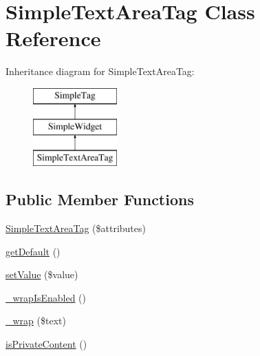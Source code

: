 \hypertarget{class_simple_text_area_tag}{
\section{SimpleTextAreaTag Class Reference}
\label{class_simple_text_area_tag}
}
Inheritance diagram for SimpleTextAreaTag:\begin{figure}[H]
\begin{center}
\leavevmode
\includegraphics[height=3.000000cm]{class_simple_text_area_tag}
\end{center}
\end{figure}
\subsection*{Public Member Functions}
\begin{DoxyCompactItemize}
\item 
\hyperlink{class_simple_text_area_tag_a022780742c3c3265a938c0809a45661c}{SimpleTextAreaTag} (\$attributes)
\item 
\hyperlink{class_simple_text_area_tag_af6b231753b32277ea079a1c55355a27a}{getDefault} ()
\item 
\hyperlink{class_simple_text_area_tag_a5b56885c1a6c81bd955963843586ad34}{setValue} (\$value)
\item 
\hyperlink{class_simple_text_area_tag_a1e2a78176ee9179f70c0a7e7b4a6e103}{\_\-wrapIsEnabled} ()
\item 
\hyperlink{class_simple_text_area_tag_a9bfa978f5170d9a10ec62d83c5460258}{\_\-wrap} (\$text)
\item 
\hyperlink{class_simple_text_area_tag_aef83c24c5a19caeea6447b48f2a3243a}{isPrivateContent} ()
\end{DoxyCompactItemize}


